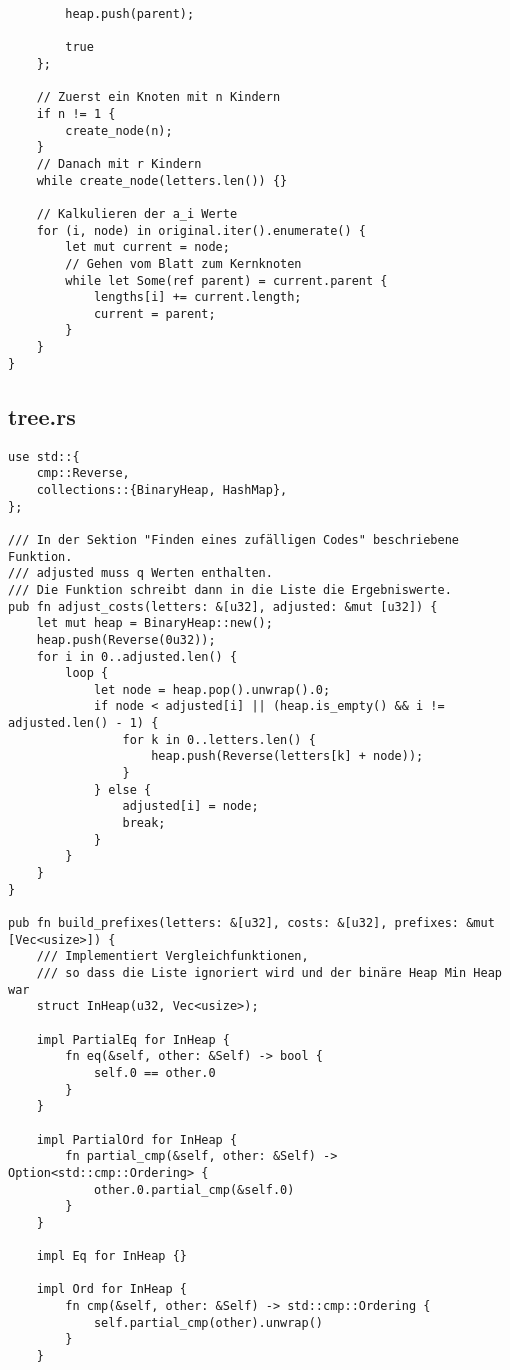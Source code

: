 \begin{lstlisting}
        heap.push(parent);

        true
    };

    // Zuerst ein Knoten mit n Kindern
    if n != 1 {
        create_node(n);
    }
    // Danach mit r Kindern
    while create_node(letters.len()) {}

    // Kalkulieren der a_i Werte
    for (i, node) in original.iter().enumerate() {
        let mut current = node;
        // Gehen vom Blatt zum Kernknoten
        while let Some(ref parent) = current.parent {
            lengths[i] += current.length;
            current = parent;
        }
    }
}
\end{lstlisting}
\subsection{tree.rs}
\begin{lstlisting}
use std::{
    cmp::Reverse,
    collections::{BinaryHeap, HashMap},
};

/// In der Sektion "Finden eines zufälligen Codes" beschriebene Funktion.
/// adjusted muss q Werten enthalten.
/// Die Funktion schreibt dann in die Liste die Ergebniswerte.
pub fn adjust_costs(letters: &[u32], adjusted: &mut [u32]) {
    let mut heap = BinaryHeap::new();
    heap.push(Reverse(0u32));
    for i in 0..adjusted.len() {
        loop {
            let node = heap.pop().unwrap().0;
            if node < adjusted[i] || (heap.is_empty() && i != adjusted.len() - 1) {
                for k in 0..letters.len() {
                    heap.push(Reverse(letters[k] + node));
                }
            } else {
                adjusted[i] = node;
                break;
            }
        }
    }
}

pub fn build_prefixes(letters: &[u32], costs: &[u32], prefixes: &mut [Vec<usize>]) {
    /// Implementiert Vergleichfunktionen,
    /// so dass die Liste ignoriert wird und der binäre Heap Min Heap war
    struct InHeap(u32, Vec<usize>);

    impl PartialEq for InHeap {
        fn eq(&self, other: &Self) -> bool {
            self.0 == other.0
        }
    }

    impl PartialOrd for InHeap {
        fn partial_cmp(&self, other: &Self) -> Option<std::cmp::Ordering> {
            other.0.partial_cmp(&self.0)
        }
    }

    impl Eq for InHeap {}

    impl Ord for InHeap {
        fn cmp(&self, other: &Self) -> std::cmp::Ordering {
            self.partial_cmp(other).unwrap()
        }
    }


\end{lstlisting}
